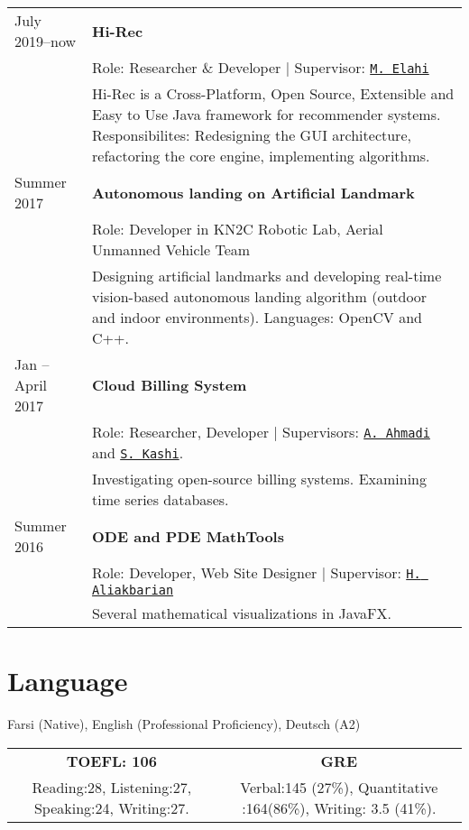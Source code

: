 \documentclass[letterpaper]{article}
\begin{document}
{{\renewcommand{\arraystretch}{1.2}
\begin{tabular}{l p{15cm}}
July 2019--now  & \textbf{Hi-Rec} \\ & Role: Researcher \& Developer | Supervisor: \href{https://scholar.google.com/citations?user=aUWF7LYAAAAJ&hl=en}{\tt M. Elahi} \\&Hi-Rec is a Cross-Platform, Open Source, Extensible and Easy to Use Java framework for recommender systems. Responsibilites: Redesigning the GUI architecture, refactoring the core engine, implementing algorithms.
\\
Summer 2017 & \textbf{Autonomous landing on Artificial Landmark} \\ & Role: Developer in KN2C Robotic Lab, Aerial Unmanned Vehicle Team \\&Designing artificial landmarks and developing real-time vision-based autonomous landing algorithm (outdoor and indoor environments). Languages: OpenCV and C++.
\\
Jan – April 2017 & \textbf{Cloud Billing System} \\& Role: Researcher, Developer | Supervisors: \href{http://wp.kntu.ac.ir/ahmadi/}{\tt A. Ahmadi} and \href{http://wp.kntu.ac.ir/sedighian/}{\tt  S. Kashi}.
\\&
Investigating open-source billing systems. Examining time series databases.
\\
Summer 2016 &  \textbf{ODE and PDE MathTools} \\&
Role: Developer, Web Site Designer | Supervisor: \href{http://wp.kntu.ac.ir/aliakbarian/}{\tt H. Aliakbarian} \\&
Several mathematical visualizations in JavaFX.

\end{tabular}

\section*{Language}

Farsi (Native), English (Professional Proficiency), Deutsch (A2)\newline



\begin{tabular}{|c|c|}
\textbf{TOEFL: 106} & \textbf{GRE} \\
Reading:28, Listening:27, Speaking:24, Writing:27. & Verbal:145 (27\%), Quantitative :164(86\%), Writing: 3.5 (41\%).\\
\end{tabular}

}}
\end{document}
